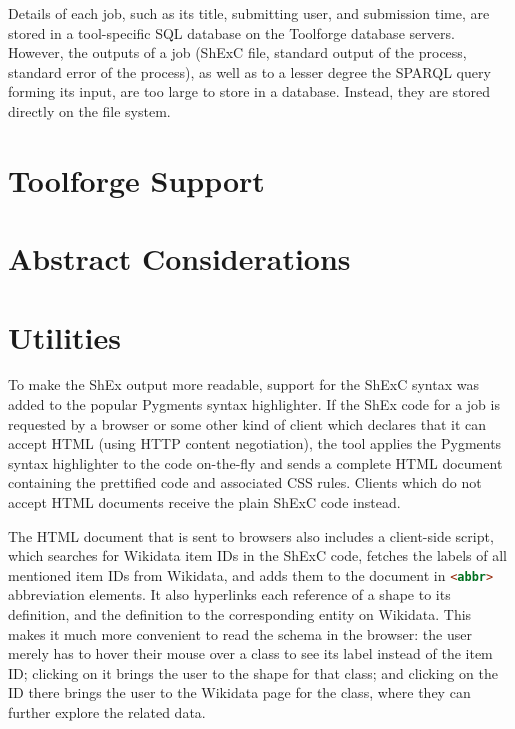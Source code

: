 Details of each job,
such as its title, submitting user, and submission time,
are stored in a tool-specific SQL database on the Toolforge database servers.
However, the outputs of a job
(ShExC file, standard output of the process, standard error of the process),
as well as to a lesser degree the SPARQL query forming its input,
are too large to store in a database.
Instead, they are stored directly on the file system.

\section{Toolforge Support}
\label{sec:wdsi:Toolforge}

\section{Abstract Considerations}
\label{sec:wdsi:abstract}


\section{Utilities}
\label{sec:wdsi:utilities}

To make the ShEx output more readable,
support for the ShExC syntax was added to the popular Pygments syntax highlighter. %
If the ShEx code for a job %
is requested by a browser
or some other kind of client which declares that it can accept HTML
(using HTTP content negotiation),
the tool applies the Pygments syntax highlighter to the code on-the-fly
and sends a complete HTML document containing the prettified code and associated CSS rules.
Clients which do not accept HTML documents receive the plain ShExC code instead.

The HTML document that is sent to browsers
also includes a client-side script,
which searches for Wikidata item IDs in the ShExC code,
fetches the labels of all mentioned item IDs from Wikidata,
and adds them to the document in \lstinline[language=html]{<abbr>} abbreviation elements.
It also hyperlinks each reference of a shape to its definition,
and the definition to the corresponding entity on Wikidata.
This makes it much more convenient to read the schema in the browser:
the user merely has to hover their mouse over a class to see its label instead of the item ID;
clicking on it brings the user to the shape for that class;
and clicking on the ID there brings the user to the Wikidata page for the class,
where they can further explore the related data.

